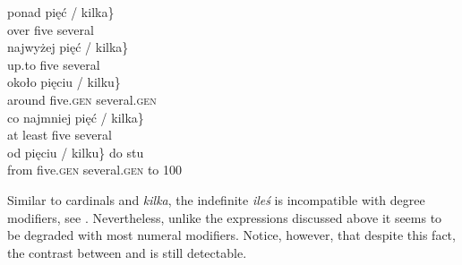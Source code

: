 \documentclass[output=paper,
]{langscibook}
\begin{document}
\begin{multicols}{2}
		\ea \label{ex:numeral-modifiers-cardinals-kilka} \ea \gll ponad \minsp{\{} pięć / {kilka\}}\\
		over {} five {} several\\
		\ex \gll najwyżej \minsp{\{} pięć / {kilka\}}\\
		up.to {} five {} several\\
		\ex \gll około \minsp{\{} pięciu / {kilku\}}\\
		around {} five.\textsc{gen} {} several.\textsc{gen}\\
		\ex \gll co najmniej \minsp{\{} pięć / {kilka\}}\\
		at least {} five {} several\\
		\ex \gll od \minsp{\{} pięciu / {kilku\}} do stu\\
		from {} five.\textsc{gen} {} several.\textsc{gen} to 100\\
		\z
        \z

	\end{multicols}
	
	\noindent Similar to cardinals and \textit{kilka}, the indefinite \textit{ileś} is incompatible with degree modifiers, see . Nevertheless, unlike the expressions discussed above it seems to be degraded with most numeral modifiers. Notice, however, that despite this fact, the contrast between  and  is still detectable.
	
	\begin{multicols}{2}
		
		\ea \label{ex:degree-modifiers-iles}
	\columnbreak
	
		\z
        \z
		\end{multicols}
		
\end{document}
